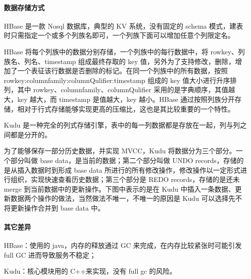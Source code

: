 \documentclass[hyperref, UTF-8]{ctexart}
\begin{document}
\paragraph{数据存储方式}
\label{sec:org497f465}

HBase 是一款 Nosql 数据库，典型的 KV 系统，没有固定的 schema 模式，建表时只需指定一个或多个列族名即可，一个列族下面可以增加任意个列限定名。

HBase 将每个列族中的数据分别存储，一个列族中的每行数据中，将 rowkey、列族名、列名、timestamp 组成最终存取的 key 值，另外为了支持修改，删除，增加了一个表征该行数据是否删除的标记。在同一个列族中的所有数据，按照 rowkey:columnfamily:columnQulifier:timestamp 组成的 key 值大小进行升序排列，其中 rowkey、columnfamily、columnQulifier 采用的是字典顺序，其值越大，key 越大，而 timestamp 是值越大，key 越小。HBase 通过按照列族分开存储，相对于行式存储能够实现更高的压缩比，这也是其比较重要的一个特性。

Kudu 是一种完全的列式存储引擎，表中的每一列数据都是存放在一起，列与列之间都是分开的。

为了能够保存一部分历史数据，并实现 MVCC，Kudu 将数据分为三个部分。一个部分叫做 base data，是当前的数据；第二个部分叫做 UNDO records，存储的是从插入数据时到形成 base data 所进行的所有修改操作，修改操作以一定形式进行组织，实现快速查看历史数据；第三个部分是 REDO records，存储的是还未 merge 到当前数据中的更新操作。下图中表示的是在 Kudu 中插入一条数据、更新数据两个操作的做法，当然做法不唯一，不唯一的原因是 Kudu 可以选择先不将更新操作合并到 base data 中。

\paragraph{其它差异}
\label{sec:org7802c91}

HBase：使用的 java，内存的释放通过 GC 来完成，在内存比较紧张时可能引发 full GC 进而导致服务不稳定；

Kudu：核心模块用的 C++来实现，没有 full gc 的风险。
\end{document}

